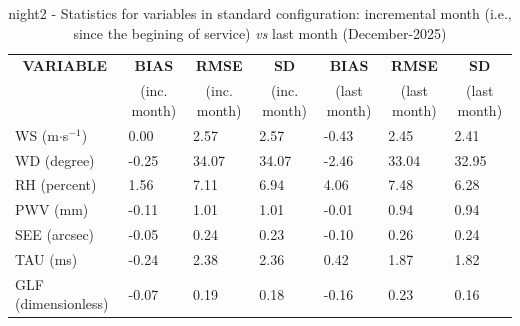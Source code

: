 \begin{table}[h!]
\begin{center}
\begin{tabular}{|l|l|l|l|l|l|l|}
\hline
\multicolumn{1}{|c|}{\cellcolor[HTML]{C0C0C0}\textbf{VARIABLE}} & \multicolumn{1}{c|}{\cellcolor[HTML]{C0C0C0}\textbf{BIAS}} & \multicolumn{1}{c|}{\cellcolor[HTML]{C0C0C0}\textbf{RMSE}} & \multicolumn{1}{c|}{\cellcolor[HTML]{C0C0C0}\textbf{SD}} & \multicolumn{1}{c|}{\cellcolor[HTML]{C0C0C0}\textbf{BIAS}} & \multicolumn{1}{c|}{\cellcolor[HTML]{C0C0C0}\textbf{RMSE}} & \multicolumn{1}{c|}{\cellcolor[HTML]{C0C0C0}\textbf{SD}}\\
\multicolumn{1}{|c|}{\cellcolor[HTML]{C0C0C0}} & \multicolumn{1}{c|}{\cellcolor[HTML]{C0C0C0}(inc. month)} & \multicolumn{1}{c|}{\cellcolor[HTML]{C0C0C0}(inc. month)} & \multicolumn{1}{c|}{\cellcolor[HTML]{C0C0C0}(inc. month)} & \multicolumn{1}{c|}{\cellcolor[HTML]{C0C0C0}(last month)} & \multicolumn{1}{c|}{\cellcolor[HTML]{C0C0C0}(last month)} & \multicolumn{1}{c|}{\cellcolor[HTML]{C0C0C0}(last month)}\\\hline
\cellcolor[HTML]{C0C0C0}WS (m$\cdot$s$^{-1}$) &      0.00  &      2.57  &      2.57  &     -0.43     &      2.45     &      2.41\\
\cellcolor[HTML]{C0C0C0}WD (degree)           &     -0.25  &     34.07  &     34.07  &     -2.46     &     33.04     &     32.95\\
\cellcolor[HTML]{C0C0C0}RH (percent)          &      1.56  &      7.11  &      6.94  &      4.06     &      7.48     &      6.28\\
\cellcolor[HTML]{C0C0C0}PWV (mm)              &     -0.11 &      1.01 &      1.01 &     -0.01    &      0.94    &      0.94\\
\cellcolor[HTML]{C0C0C0}SEE (arcsec)          &     -0.05 &      0.24 &      0.23 &     -0.10    &      0.26    &      0.24\\
\cellcolor[HTML]{C0C0C0}TAU (ms)              &     -0.24 &      2.38 &      2.36 &      0.42    &      1.87    &      1.82\\
\cellcolor[HTML]{C0C0C0}GLF (dimensionless)   &     -0.07 &      0.19 &      0.18 &     -0.16    &      0.23    &      0.16\\
\hline
\end{tabular}
\caption{night2 - Statistics for variables in standard configuration: incremental month (i.e., since the begining of service) \textit{vs} last month (December-2025)}\label{tab:night2:statBEF}
\end{center}
\end{table}

